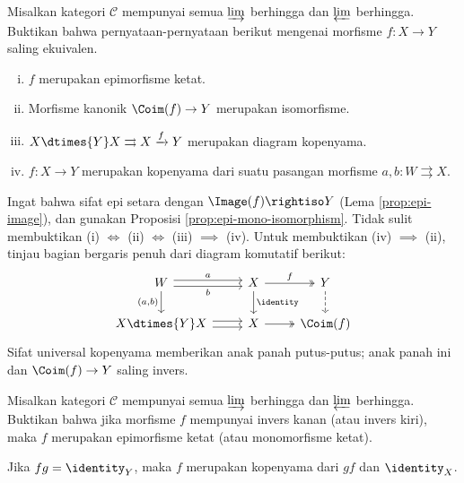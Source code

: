 \begin{Exercises}
	\item Misalkan kategori $\mathcal{C}$ mempunyai semua $\varinjlim$
	berhingga dan $\varprojlim$ berhingga. Buktikan bahwa pernyataan-pernyataan
	berikut mengenai morfisme $f:X\to Y$ saling ekuivalen.
	\begin{enumerate}[(i)]
		\item $f$ merupakan epimorfisme ketat.
		\item Morfisme kanonik $\Coim(f)\to Y$ merupakan isomorfisme.
		\item $X\dtimes{Y}X\rightrightarrows X\xrightarrow{f}Y$ merupakan
		diagram kopenyama.
		\item $f:X\to Y$ merupakan kopenyama dari suatu pasangan morfisme
		$a,b:W\rightrightarrows X$.
	\end{enumerate}
	\begin{hint}
		Ingat bahwa sifat epi setara dengan $\Image(f)\rightiso Y$ (Lema
		\ref{prop:epi-image}), dan gunakan Proposisi
		\ref{prop:epi-mono-isomorphism}. Tidak sulit membuktikan
		(i) $\iff$ (ii) $\iff$ (iii) $\implies$ (iv). Untuk membuktikan
		(iv) $\implies$ (ii), tinjau bagian bergaris penuh dari diagram
		komutatif berikut:
		\[\begin{tikzcd}
			W \arrow[shift left, r, "a"] \arrow[shift right, r, "b"'] \arrow[d, "{(a, b)}"'] & X \arrow[d, "\identity"] \arrow[twoheadrightarrow, r, "f"] & Y \arrow[dashed, d] \\
			X \dtimes{Y} X \arrow[shift left, r] \arrow[shift right, r] & X \arrow[twoheadrightarrow, r] & \Coim(f)
		\end{tikzcd}\]
		Sifat universal kopenyama memberikan anak panah putus-putus; anak
		panah ini dan $\Coim(f)\to Y$ saling invers.
	\end{hint}

	\item Misalkan kategori $\mathcal{C}$ mempunyai semua $\varinjlim$
	berhingga dan $\varprojlim$ berhingga. Buktikan bahwa jika morfisme $f$
	mempunyai invers kanan (atau invers kiri), maka $f$ merupakan epimorfisme
	ketat (atau monomorfisme ketat).
	\begin{hint}
		Jika $fg=\identity_Y$, maka $f$ merupakan kopenyama dari $gf$ dan
		$\identity_X$.
	\end{hint}


\end{Exercises}
